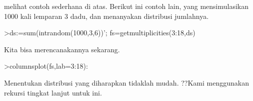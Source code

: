 \documentclass[a4paper,10pt]{article}
\begin{document}
\begin{eulernotebook}
\begin{eulercomment}
\begin{eulercomment}
\begin{eulercomment}
\begin{eulercomment}
\begin{eulercomment}
\begin{eulercomment}
\begin{eulercomment}
\begin{eulercomment}
\begin{eulercomment}
\begin{eulercomment}
\begin{eulercomment}
\begin{eulercomment}
\begin{eulercomment}
\begin{eulercomment}
\begin{eulercomment}
\begin{eulercomment}
\begin{eulercomment}
\begin{eulercomment}
\begin{eulercomment}
\begin{eulercomment}
\begin{eulercomment}
\begin{eulercomment}
\begin{eulercomment}
\begin{eulercomment}
\begin{eulercomment}
\begin{eulercomment}
\begin{eulercomment}
\begin{eulercomment}
\begin{eulercomment}
\begin{eulercomment}
\begin{eulercomment}
\begin{eulercomment}
\begin{eulercomment}
melihat contoh sederhana di atas. Berikut ini contoh lain, yang
mensimulasikan 1000 kali lemparan 3 dadu, dan menanyakan distribusi
jumlahnya.
\end{eulercomment}
\begin{eulerprompt}
>ds:=sum(intrandom(1000,3,6))';  fs=getmultiplicities(3:18,ds)
\end{eulerprompt}
\begin{euleroutput}
  [5,  12,  25,  49,  73,  94,  128,  141,  124,  116,  105,  62,  37,
  19,  7,  3]
\end{euleroutput}
\begin{eulercomment}
Kita bisa merencanakannya sekarang.
\end{eulercomment}
\begin{eulerprompt}
>columnsplot(fs,lab=3:18):
\end{eulerprompt}
\begin{eulercomment}
Menentukan distribusi yang diharapkan tidaklah mudah. ??Kami
menggunakan rekursi tingkat lanjut untuk ini.


\end{eulercomment}
\end{eulercomment}
\end{eulercomment}
\end{eulercomment}
\end{eulercomment}
\end{eulercomment}
\end{eulercomment}
\end{eulercomment}
\end{eulercomment}
\end{eulercomment}
\end{eulercomment}
\end{eulercomment}
\end{eulercomment}
\end{eulercomment}
\end{eulercomment}
\end{eulercomment}
\end{eulercomment}
\end{eulercomment}
\end{eulercomment}
\end{eulercomment}
\end{eulercomment}
\end{eulercomment}
\end{eulercomment}
\end{eulercomment}
\end{eulercomment}
\end{eulercomment}
\end{eulercomment}
\end{eulercomment}
\end{eulercomment}
\end{eulercomment}
\end{eulercomment}
\end{eulercomment}
\end{eulercomment}
\end{eulernotebook}
\end{document}
